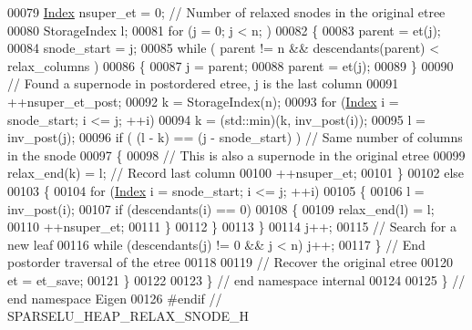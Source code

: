 \begin{DoxyCode}
00079   \hyperlink{namespace_eigen_a62e77e0933482dafde8fe197d9a2cfde}{Index} nsuper\_et = 0; \textcolor{comment}{// Number of relaxed snodes in the original etree }
00080   StorageIndex l; 
00081   \textcolor{keywordflow}{for} (j = 0; j < n; )
00082   \{
00083     parent = et(j);
00084     snode\_start = j; 
00085     \textcolor{keywordflow}{while} ( parent != n && descendants(parent) < relax\_columns ) 
00086     \{
00087       j = parent; 
00088       parent = et(j);
00089     \}
00090     \textcolor{comment}{// Found a supernode in postordered etree, j is the last column }
00091     ++nsuper\_et\_post;
00092     k = StorageIndex(n);
00093     \textcolor{keywordflow}{for} (\hyperlink{namespace_eigen_a62e77e0933482dafde8fe197d9a2cfde}{Index} i = snode\_start; i <= j; ++i)
00094       k = (std::min)(k, inv\_post(i));
00095     l = inv\_post(j);
00096     \textcolor{keywordflow}{if} ( (l - k) == (j - snode\_start) )  \textcolor{comment}{// Same number of columns in the snode}
00097     \{
00098       \textcolor{comment}{// This is also a supernode in the original etree}
00099       relax\_end(k) = l; \textcolor{comment}{// Record last column }
00100       ++nsuper\_et; 
00101     \}
00102     \textcolor{keywordflow}{else} 
00103     \{
00104       \textcolor{keywordflow}{for} (\hyperlink{namespace_eigen_a62e77e0933482dafde8fe197d9a2cfde}{Index} i = snode\_start; i <= j; ++i) 
00105       \{
00106         l = inv\_post(i);
00107         \textcolor{keywordflow}{if} (descendants(i) == 0) 
00108         \{
00109           relax\_end(l) = l;
00110           ++nsuper\_et;
00111         \}
00112       \}
00113     \}
00114     j++;
00115     \textcolor{comment}{// Search for a new leaf}
00116     \textcolor{keywordflow}{while} (descendants(j) != 0 && j < n) j++;
00117   \} \textcolor{comment}{// End postorder traversal of the etree}
00118   
00119   \textcolor{comment}{// Recover the original etree}
00120   et = et\_save; 
00121 \}
00122 
00123 \} \textcolor{comment}{// end namespace internal}
00124 
00125 \} \textcolor{comment}{// end namespace Eigen}
00126 \textcolor{preprocessor}{#endif // SPARSELU\_HEAP\_RELAX\_SNODE\_H}
\end{DoxyCode}
